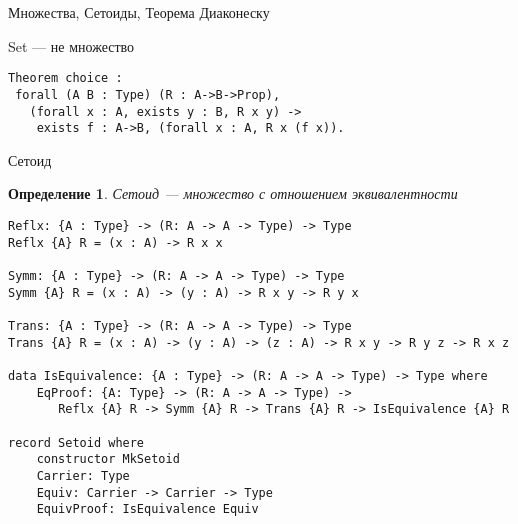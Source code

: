 \documentclass[aspectratio=169,dvipsnames,usenames]{beamer}
\begin{document}
\newtheorem{dfn}{Определение}[section]
\newtheorem{nte}{Замечание}[section]

\newtheorem{axiom}{Аксиома}[section]
\newtheorem{thm}{Теорема}[section]
\newtheorem{lmm}[theorem]{Лемма}
\newtheorem{statement}{Утверждение}[section]
\newtheorem{oun_paragraph}{Пункт}[section]
\newtheorem{cons}{Следствие}[section]
\newtheorem*{exm}{Пример}

\newcommand{\comb}[1]{\operatorname{\mathcal{#1}}}
\newcommand{\func}[1]{\operatorname{#1}}
\newcommand{\reduction}[1]{{\color{OrangeRed}#1}}
\newcommand{\set}[1]{\left\{#1\right\}}

\def\from#1{\par \parbox{0.7\textwidth}{\par \hfill\raggedleft \it #1}} 

\begin{frame}{}
\begin{center}
{\LARGE Множества, Сетоиды, Теорема Диаконеску}
\end{center}
\end{frame}

\begin{frame}[fragile]{Set --- не множество}
\begin{verbatim}
Theorem choice :
 forall (A B : Type) (R : A->B->Prop),
   (forall x : A, exists y : B, R x y) ->
    exists f : A->B, (forall x : A, R x (f x)).
\end{verbatim}
\end{frame}

\begin{frame}{Сетоид}
\begin{dfn}Сетоид --- множество с отношением эквивалентности\end{dfn}
\end{frame}

\begin{frame}[fragile]{}
\small
\begin{verbatim}
Reflx: {A : Type} -> (R: A -> A -> Type) -> Type
Reflx {A} R = (x : A) -> R x x

Symm: {A : Type} -> (R: A -> A -> Type) -> Type
Symm {A} R = (x : A) -> (y : A) -> R x y -> R y x

Trans: {A : Type} -> (R: A -> A -> Type) -> Type
Trans {A} R = (x : A) -> (y : A) -> (z : A) -> R x y -> R y z -> R x z

data IsEquivalence: {A : Type} -> (R: A -> A -> Type) -> Type where
    EqProof: {A: Type} -> (R: A -> A -> Type) -> 
       Reflx {A} R -> Symm {A} R -> Trans {A} R -> IsEquivalence {A} R

record Setoid where
    constructor MkSetoid
    Carrier: Type
    Equiv: Carrier -> Carrier -> Type
    EquivProof: IsEquivalence Equiv
\end{verbatim}
\end{frame}
\end{document}
